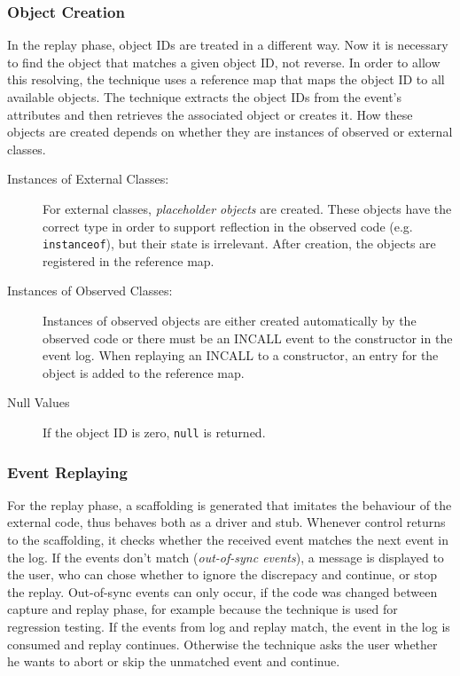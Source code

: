 \subsubsection{Object Creation}
In the replay phase, object IDs are treated in a different way. Now it is necessary to find the object that matches a given object ID, not reverse. In order to allow this resolving, the technique uses a reference map that maps the object ID to all available  objects. The technique extracts the object IDs from the event's attributes and then retrieves the associated object or creates it. How these objects are created depends on whether they are instances of observed or external classes.
\begin{description}
 \item [Instances of External Classes:] For external classes, \emph{placeholder objects} are created. These objects have the correct type in order to support reflection in the observed code (e.g. \texttt{instanceof}), but their state is irrelevant. After creation, the objects are registered in the reference map.
 \item [Instances of Observed Classes:] Instances of observed objects are either created automatically by the observed code or there must be an INCALL event to the constructor in the event log. When replaying an INCALL to a constructor, an entry for the object is added to the reference map.
 \item [Null Values] If the object ID is zero, \texttt{null} is returned.
\end{description}

\subsubsection{Event Replaying}
For the replay phase, a scaffolding is generated that imitates the behaviour of the external code, thus behaves both as a driver and stub. Whenever control returns to the scaffolding, it checks whether the received event matches the next event in the log. If the events don't match (\emph{out-of-sync events}), a message is displayed to the user, who can chose whether to ignore the discrepacy and continue, or stop the replay.  Out-of-sync events can only occur, if the code was changed between capture and replay phase, for example because the technique is used for regression testing. If the events from log and replay match, the event in the log is  consumed and replay continues. Otherwise the technique asks the user whether he wants to abort or skip the unmatched event and continue.

